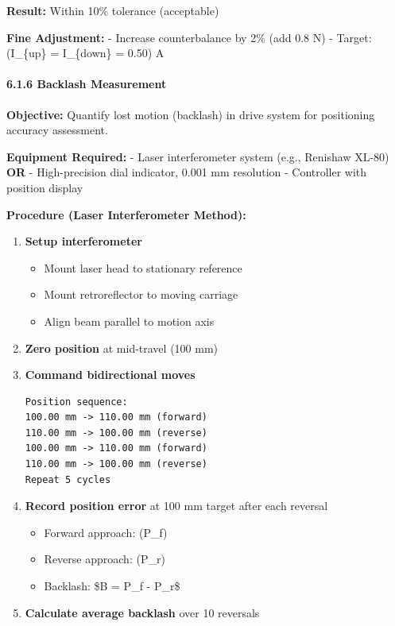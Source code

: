 \documentclass[
]{article}
\providecommand{\tightlist}{%
  \setlength{\itemsep}{0pt}\setlength{\parskip}{0pt}}
\begin{document}
\textbf{Result:} Within 10\% tolerance (acceptable)

\textbf{Fine Adjustment:} - Increase counterbalance by 2\% (add 0.8 N) -
Target: (I\_\{up\} = I\_\{down\} = 0.50) A

\paragraph{6.1.6 Backlash Measurement}\label{backlash-measurement-1}

\textbf{Objective:} Quantify lost motion (backlash) in drive system for
positioning accuracy assessment.

\textbf{Equipment Required:} - Laser interferometer system (e.g.,
Renishaw XL-80) \textbf{OR} - High-precision dial indicator, 0.001 mm
resolution - Controller with position display

\textbf{Procedure (Laser Interferometer Method):}

\begin{enumerate}
\def\labelenumi{\arabic{enumi}.}
\item
  \textbf{Setup interferometer}

  \begin{itemize}
  \tightlist
  \item
    Mount laser head to stationary reference
  \item
    Mount retroreflector to moving carriage
  \item
    Align beam parallel to motion axis
  \end{itemize}
\item
  \textbf{Zero position} at mid-travel (100 mm)
\item
  \textbf{Command bidirectional moves}

\begin{verbatim}
Position sequence:
100.00 mm -> 110.00 mm (forward)
110.00 mm -> 100.00 mm (reverse)
100.00 mm -> 110.00 mm (forward)
110.00 mm -> 100.00 mm (reverse)
Repeat 5 cycles
\end{verbatim}
\item
  \textbf{Record position error} at 100 mm target after each reversal

  \begin{itemize}
  \tightlist
  \item
    Forward approach: (P\_f)
  \item
    Reverse approach: (P\_r)
  \item
    Backlash: \$B = \textbar P\_f - P\_r\textbar\$
  \end{itemize}
\item
  \textbf{Calculate average backlash} over 10 reversals
\end{enumerate}
\end{document}
